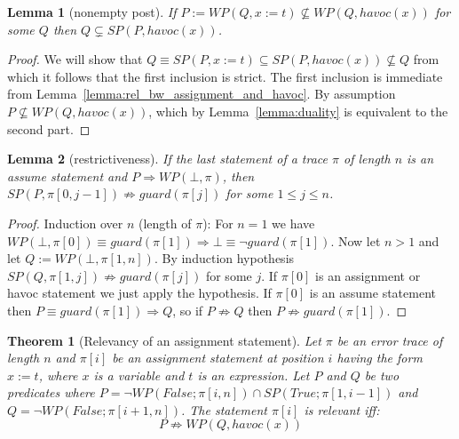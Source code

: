 \documentclass{article}
\newcommand{\limp}{\Rightarrow}
\newcommand{\WP}[2]{\mathit{WP}(#1,#2)}
\newcommand{\SP}[2]{\mathit{SP}(#1,#2)}
\newcommand{\havoc}{\mathit{havoc}}
\newcommand{\guard}{\mathit{guard}}
\newtheorem{theorem}{Theorem}
\newtheorem{lemma}{Lemma}
\begin{document}
\begin{lemma}[nonempty post]\label{lemma:nonempty_post}
	If $P := \WP{Q}{x := t} \nsubseteq \WP{Q}{\havoc(x)}$ for some $Q$ then $Q \subsetneq \SP{P}{\havoc(x)}$.
\end{lemma}
\begin{proof}
	We will show that $Q \equiv \SP{P}{x := t} \subseteq \SP{P}{\havoc(x)} \not\subseteq Q$ from which it follows that the first inclusion is strict.
	The first inclusion is immediate from Lemma~\ref{lemma:rel_bw_assignment_and_havoc}.
	By assumption $P \not\subseteq \WP{Q}{\havoc(x)}$, which by Lemma~\ref{lemma:duality} is equivalent to the second part.
\end{proof}

\begin{lemma}[restrictiveness]\label{lemma:spfalse}
	If the last statement of a trace $\pi$ of length $n$ is an assume statement and $P \limp \WP{\bot}{\pi}$, then $\SP{P}{\pi[0, j-1]} \not\limp \guard(\pi[j])$ for some $1 \leq j \leq n$.
\end{lemma}
\begin{proof}
	Induction over $n$ (length of $\pi$):
	For $n = 1$ we have $\WP{\bot}{\pi[0]} \equiv \guard(\pi[1]) \limp \bot \equiv \neg \guard(\pi[1])$.
	Now let $n > 1$ and let $Q := \WP{\bot}{\pi[1, n]}$.
	By induction hypothesis $\SP{Q}{\pi[1, j]} \not\limp \guard(\pi[j])$ for some $j$.
	If $\pi[0]$ is an assignment or havoc statement we just apply the hypothesis.
	If $\pi[0]$ is an assume statement then $P \equiv \guard(\pi[1]) \limp Q$, so if $P \not\limp Q$ then $P \not\limp \guard(\pi[1])$.
\end{proof}

\newpage

\begin{theorem}[Relevancy of an assignment statement]\label{mydef:relevancytheorem}
Let $\pi$ be an error trace of length $n$ and $\pi[i]$ be an assignment statement at position $i$ having the form $x:=t$, where $x$ is a variable and $t$ is an expression. Let $P$ and $Q$ be two predicates where $P = \neg WP(False; \pi[i,n]) \cap SP(True; \pi[1, i-1])$ and $Q =  \neg WP(False; \pi[i+1,n])$. The statement $\pi[i]$ is relevant iff:
 $$P \not \limp WP(Q,havoc(x))$$
\end{theorem}
\end{document}
